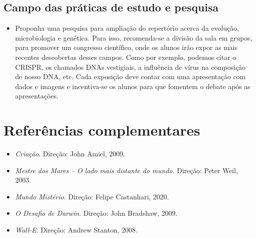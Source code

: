 \documentclass[11pt]{extarticle}
\begin{document}
\subsection{Campo das práticas de estudo e pesquisa}

\begin{comment}
``O campo das práticas de estudo e pesquisa mantém destaque para os gêneros
e habilidades envolvidos na leitura/escuta e produção de textos de diferentes
áreas do conhecimento e para as habilidades e procedimentos envolvidos no
estudo. Ganham realce também as habilidades relacionadas à análise, síntese,
reflexão, problematização e pesquisa: estabelecimento de recorte da questão ou
problema; seleção de informações; estabelecimento das condições de coleta de
dados para a realização de levantamentos; realização de pesquisas de diferentes
tipos; tratamento dos dados e informações; e formas de uso e socialização dos
resultados e análises.

Além de fazer uso competente da língua e das outras semioses, os estudantes
devem ter uma atitude investigativa e criativa em relação a elas e compreender
princípios e procedimentos metodológicos que orientam a produção do
conhecimento sobre a língua e as linguagens e a formulação de regras.'' (BNCC,
p. 495-496)
\end{comment}

\begin{itemize} \item Proponha uma pesquisa para ampliação do repertório acerca
      da evolução, microbiologia e genética. Para isso, recomenda-se a divisão
      da sala em grupos, para promover um congresso científico, onde os alunos
      irão expor as mais recentes descobertas desses campos. Como por exemplo,
      podemos citar o CRISPR, os chamados DNAs vestigiais, a influência de
      vírus na composição de nosso DNA, etc. Cada exposição deve contar com uma
      apresentação com dados e imagens e incentiva-se os alunos para que
  fomentem o debate após as apresentações.  \end{itemize}


\section{Referências complementares}


\begin{itemize}
\item \emph{Criação}. Direção: John Amiel, 2009.

\item \emph{Mestre dos Mares -- O lado mais distante do mundo.} Direção: Peter Weil, 2003.

\item \emph{Mundo Mistério.} Direção: Felipe Castanhari, 2020.

\item \emph{O Desafio de Darwin}. Direção: John Bradshaw, 2009.

\item \emph{Wall-E}. Direção: Andrew Stanton, 2008.
\end{itemize}
\end{document}
